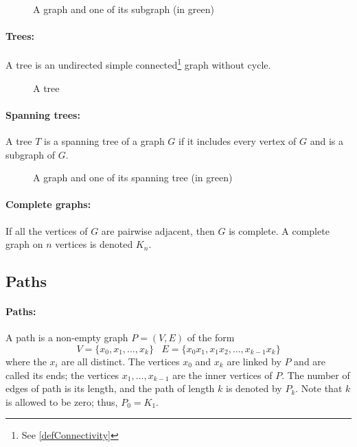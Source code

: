\begin{figure}[!h]
  \begin{center}
    
  \end{center}
  \caption{A graph and one of its subgraph (in green)}
\end{figure}

\paragraph{Trees:}
A tree is an undirected simple connected\footnote{See \ref{defConnectivity}}
graph without cycle.

\begin{figure}[!h]
  \begin{center}
    
  \end{center}
  \caption{A tree}
\end{figure}

\paragraph{Spanning trees:}
A tree $T$ is a spanning tree of a graph $G$ if it includes every vertex of $G$ 
and is a subgraph of $G$.

\begin{figure}[!h]
  \begin{center}
    
  \end{center}
  \caption{A graph and one of its spanning tree (in green)}
\end{figure}

\paragraph{Complete graphs:}
If all the vertices of $G$ are pairwise adjacent, then $G$ is complete. A
complete graph on $n$ vertices is denoted $K_n$.

\subsection{Paths}
\paragraph{Paths:}
A path is a non-empty graph $P = (V, E)$ of the form
$$ V = \{x_0,x_1, \dots, x_k \} \;\;\; E=\{x_0x_1, x_1x_2, \dots, x_{k-1}x_k \}$$
where the $x_i$ are all distinct. The vertices $x_0$ and $x_k$ are linked
by $P$ and are called its ends; the vertices $x_1, \dots, x_{k-1}$ are the
inner vertices of $P$. The number of edges of path is its
length, and the path of length $k$ is denoted by $P_k$. Note that $k$ is
allowed to be zero; thus, $P_0 = K_1$.

